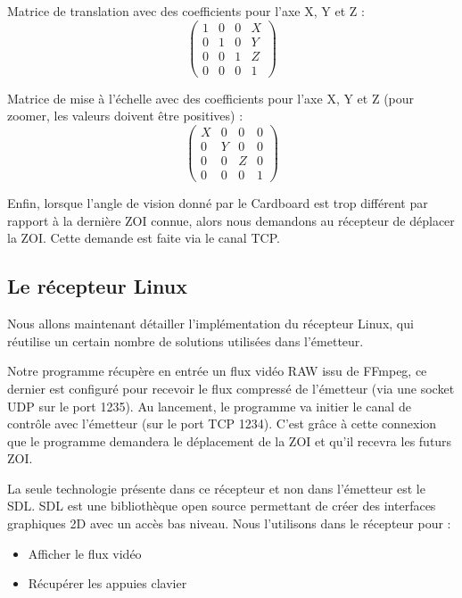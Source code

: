 \documentclass[11pt,a4paper]{article}
\begin{document}
\bigbreak
Matrice de translation avec des coefficients pour l'axe X, Y et Z :
\[ \left( \begin{array}{cccc}
1 & 0 & 0 & X \\
0 & 1 & 0 & Y \\
0 & 0 & 1 & Z \\
0 & 0 & 0 & 1 \end{array} \right)\] 

\bigbreak
Matrice de mise à l'échelle avec des coefficients pour l'axe X, Y et Z (pour zoomer, les valeurs doivent être positives) :
\[ \left( \begin{array}{cccc}
X & 0 & 0 & 0 \\
0 & Y & 0 & 0 \\
0 & 0 & Z & 0 \\
0 & 0 & 0 & 1 \end{array} \right)\] 

\bigbreak
Enfin, lorsque l'angle de vision donné par le Cardboard est trop différent par rapport à la dernière ZOI connue, alors nous demandons au récepteur de déplacer la ZOI.
Cette demande est faite via le canal TCP.

\subsection{Le récepteur Linux}
Nous allons maintenant détailler l'implémentation du récepteur Linux, qui réutilise un certain nombre de solutions utilisées dans l'émetteur.

\bigbreak
Notre programme récupère en entrée un flux vidéo RAW issu de FFmpeg, ce dernier est configuré pour recevoir le flux compressé de l'émetteur (via une socket UDP sur le port 1235).
Au lancement, le programme va initier le canal de contrôle avec l'émetteur (sur le port TCP 1234).
C'est grâce à cette connexion que le programme demandera le déplacement de la ZOI et qu'il recevra les futurs ZOI.

\bigbreak
La seule technologie présente dans ce récepteur et non dans l'émetteur est le SDL.
SDL est une bibliothèque open source permettant de créer des interfaces graphiques 2D avec un accès bas niveau.
Nous l'utilisons dans le récepteur pour :

\bigbreak
\begin{itemize}
\item{Afficher le flux vidéo}
\item{Récupérer les appuies clavier}
\end{itemize}
\end{document}
